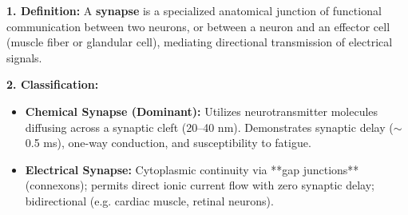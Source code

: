 \documentclass[11pt,a4paper]{article}
\begin{document}
\begin{ansbox}
\textbf{1. Definition:}
A \textbf{synapse} is a specialized anatomical junction of functional communication between two neurons, or between a neuron and an effector cell (muscle fiber or glandular cell), mediating directional transmission of electrical signals.

\textbf{2. Classification:}
\begin{itemize}[leftmargin=*]
    \item \textbf{Chemical Synapse (Dominant):} Utilizes neurotransmitter molecules diffusing across a synaptic cleft (20--40 nm). Demonstrates synaptic delay ($\sim$0.5 ms), one-way conduction, and susceptibility to fatigue.
    \item \textbf{Electrical Synapse:} Cytoplasmic continuity via **gap junctions** (connexons); permits direct ionic current flow with zero synaptic delay; bidirectional (e.g. cardiac muscle, retinal neurons).
\end{itemize}


\end{ansbox}
\end{document}
